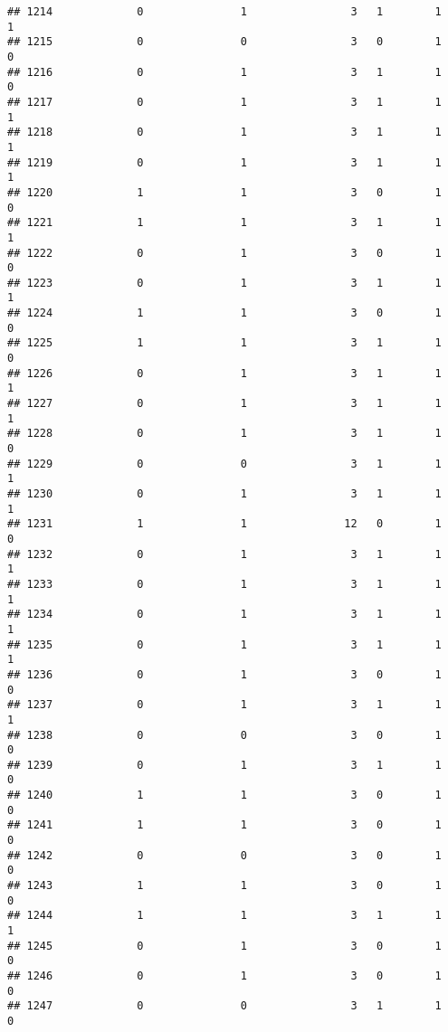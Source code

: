 \documentclass[]{article}
\begin{document}
\begin{verbatim}
## 1214             0               1                3   1        1        1
## 1215             0               0                3   0        1        0
## 1216             0               1                3   1        1        0
## 1217             0               1                3   1        1        1
## 1218             0               1                3   1        1        1
## 1219             0               1                3   1        1        1
## 1220             1               1                3   0        1        0
## 1221             1               1                3   1        1        1
## 1222             0               1                3   0        1        0
## 1223             0               1                3   1        1        1
## 1224             1               1                3   0        1        0
## 1225             1               1                3   1        1        0
## 1226             0               1                3   1        1        1
## 1227             0               1                3   1        1        1
## 1228             0               1                3   1        1        0
## 1229             0               0                3   1        1        1
## 1230             0               1                3   1        1        1
## 1231             1               1               12   0        1        0
## 1232             0               1                3   1        1        1
## 1233             0               1                3   1        1        1
## 1234             0               1                3   1        1        1
## 1235             0               1                3   1        1        1
## 1236             0               1                3   0        1        0
## 1237             0               1                3   1        1        1
## 1238             0               0                3   0        1        0
## 1239             0               1                3   1        1        0
## 1240             1               1                3   0        1        0
## 1241             1               1                3   0        1        0
## 1242             0               0                3   0        1        0
## 1243             1               1                3   0        1        0
## 1244             1               1                3   1        1        1
## 1245             0               1                3   0        1        0
## 1246             0               1                3   0        1        0
## 1247             0               0                3   1        1        0

\end{verbatim}
\end{document}
